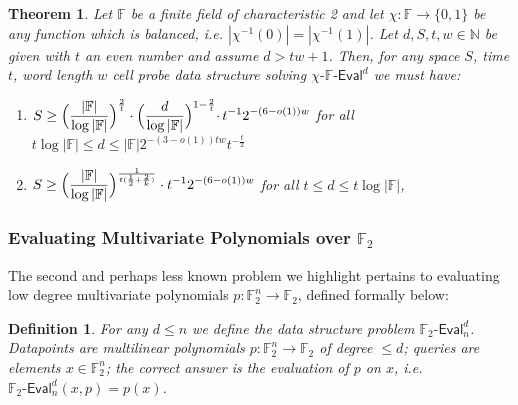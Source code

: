 \documentclass[11pt]{article}
\newtheorem{theorem}{Theorem}
\newtheorem{definition}{Definition}
\newcommand{\dash}{\text{-}}
\newcommand{\B}{\{0,1\}}
\begin{document}
\begin{theorem}\label{thm:polynom-lb}
Let $\mathbb{F}$ be a finite field of characteristic 2 and let $\chi: \mathbb{F} \to \B$ be any function which is balanced, i.e. $|\chi^{-1}(0)| = |\chi^{-1}(1)|$. Let $d,S,t,w \in \mathbb{N}$ be given with $t$ an even number and assume $d > tw + 1$. Then, for any space $S$, time $t$, word length $w$ cell probe data structure solving $\chi\dash\mathbb{F}\dash\mathsf{Eval}^d$ we must have:
\begin{enumerate}
    \item $\begin{aligned}[t]
    S \geq  \Bigl( \frac{|\mathbb{F}|}{\log |\mathbb{F}|}\Bigr)^{\frac{2}{t}} \cdot \Bigl(\frac{d}{\log |\mathbb{F}|}\Bigl)^{1 - \frac{2}{t}}  \cdot\,t^{-1}2^{-(6-o(1))w }
  \end{aligned}$ for all $t\log |\mathbb{F}| \leq d \leq |\mathbb{F}|2^{-(3-o(1))tw} t^{-\frac{t}{2}}$
  \item $\begin{aligned}[t]
    S \geq   \Bigl(\frac{|\mathbb{F}|}{\log |\mathbb{F}|}\Bigr)^{\frac{1}{t(\frac{1}{2} + \frac{2}{k})}} \cdot t^{-1}2^{-(6-o(1))w}
  \end{aligned}$ for all $t \leq d \leq t\log |\mathbb{F}|$,
\end{enumerate}
\end{theorem}

\subsubsection{Evaluating Multivariate Polynomials over $\mathbb{F}_2$}
The second and perhaps less known problem we highlight pertains to evaluating low degree multivariate polynomials $p: \mathbb{F}_2^n \to \mathbb{F}_2$, defined formally below:
\begin{definition}
For any $d\leq n$ we define the data structure problem $\mathbb{F}_2\dash\mathsf{Eval}_n^d$. Datapoints are multilinear polynomials $p: \mathbb{F}_2^n \to \mathbb{F}_2$ of degree $\leq d$; queries are elements $x \in \mathbb{F}_2^n$; the correct answer is the evaluation of $p$ on $x$, i.e. $\mathbb{F}_2\dash\mathsf{Eval}_n^d(x,p) = p(x)$.
\end{definition}
\end{document}
